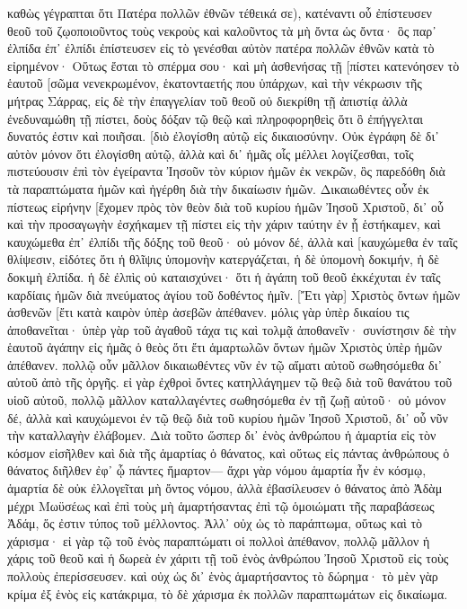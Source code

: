 καθὼς γέγραπται ὅτι Πατέρα πολλῶν ἐθνῶν τέθεικά σε), κατέναντι οὗ ἐπίστευσεν θεοῦ τοῦ ζῳοποιοῦντος τοὺς νεκροὺς καὶ καλοῦντος τὰ μὴ ὄντα ὡς ὄντα· 
ὃς παρ᾽ ἐλπίδα ἐπ᾽ ἐλπίδι ἐπίστευσεν εἰς τὸ γενέσθαι αὐτὸν πατέρα πολλῶν ἐθνῶν κατὰ τὸ εἰρημένον· Οὕτως ἔσται τὸ σπέρμα σου· 
καὶ μὴ ἀσθενήσας τῇ [πίστει κατενόησεν τὸ ἑαυτοῦ [σῶμα νενεκρωμένον, ἑκατονταετής που ὑπάρχων, καὶ τὴν νέκρωσιν τῆς μήτρας Σάρρας, 
εἰς δὲ τὴν ἐπαγγελίαν τοῦ θεοῦ οὐ διεκρίθη τῇ ἀπιστίᾳ ἀλλὰ ἐνεδυναμώθη τῇ πίστει, δοὺς δόξαν τῷ θεῷ 
καὶ πληροφορηθεὶς ὅτι ὃ ἐπήγγελται δυνατός ἐστιν καὶ ποιῆσαι. 
[διὸ ἐλογίσθη αὐτῷ εἰς δικαιοσύνην. 
Οὐκ ἐγράφη δὲ δι᾽ αὐτὸν μόνον ὅτι ἐλογίσθη αὐτῷ, 
ἀλλὰ καὶ δι᾽ ἡμᾶς οἷς μέλλει λογίζεσθαι, τοῖς πιστεύουσιν ἐπὶ τὸν ἐγείραντα Ἰησοῦν τὸν κύριον ἡμῶν ἐκ νεκρῶν, 
ὃς παρεδόθη διὰ τὰ παραπτώματα ἡμῶν καὶ ἠγέρθη διὰ τὴν δικαίωσιν ἡμῶν. 
Δικαιωθέντες οὖν ἐκ πίστεως εἰρήνην [ἔχομεν πρὸς τὸν θεὸν διὰ τοῦ κυρίου ἡμῶν Ἰησοῦ Χριστοῦ, 
δι᾽ οὗ καὶ τὴν προσαγωγὴν ἐσχήκαμεν τῇ πίστει εἰς τὴν χάριν ταύτην ἐν ᾗ ἑστήκαμεν, καὶ καυχώμεθα ἐπ᾽ ἐλπίδι τῆς δόξης τοῦ θεοῦ· 
οὐ μόνον δέ, ἀλλὰ καὶ [καυχώμεθα ἐν ταῖς θλίψεσιν, εἰδότες ὅτι ἡ θλῖψις ὑπομονὴν κατεργάζεται, 
ἡ δὲ ὑπομονὴ δοκιμήν, ἡ δὲ δοκιμὴ ἐλπίδα. 
ἡ δὲ ἐλπὶς οὐ καταισχύνει· ὅτι ἡ ἀγάπη τοῦ θεοῦ ἐκκέχυται ἐν ταῖς καρδίαις ἡμῶν διὰ πνεύματος ἁγίου τοῦ δοθέντος ἡμῖν. 
[Ἔτι γὰρ] Χριστὸς ὄντων ἡμῶν ἀσθενῶν [ἔτι κατὰ καιρὸν ὑπὲρ ἀσεβῶν ἀπέθανεν. 
μόλις γὰρ ὑπὲρ δικαίου τις ἀποθανεῖται· ὑπὲρ γὰρ τοῦ ἀγαθοῦ τάχα τις καὶ τολμᾷ ἀποθανεῖν· 
συνίστησιν δὲ τὴν ἑαυτοῦ ἀγάπην εἰς ἡμᾶς ὁ θεὸς ὅτι ἔτι ἁμαρτωλῶν ὄντων ἡμῶν Χριστὸς ὑπὲρ ἡμῶν ἀπέθανεν. 
πολλῷ οὖν μᾶλλον δικαιωθέντες νῦν ἐν τῷ αἵματι αὐτοῦ σωθησόμεθα δι᾽ αὐτοῦ ἀπὸ τῆς ὀργῆς. 
εἰ γὰρ ἐχθροὶ ὄντες κατηλλάγημεν τῷ θεῷ διὰ τοῦ θανάτου τοῦ υἱοῦ αὐτοῦ, πολλῷ μᾶλλον καταλλαγέντες σωθησόμεθα ἐν τῇ ζωῇ αὐτοῦ· 
οὐ μόνον δέ, ἀλλὰ καὶ καυχώμενοι ἐν τῷ θεῷ διὰ τοῦ κυρίου ἡμῶν Ἰησοῦ Χριστοῦ, δι᾽ οὗ νῦν τὴν καταλλαγὴν ἐλάβομεν. 
Διὰ τοῦτο ὥσπερ δι᾽ ἑνὸς ἀνθρώπου ἡ ἁμαρτία εἰς τὸν κόσμον εἰσῆλθεν καὶ διὰ τῆς ἁμαρτίας ὁ θάνατος, καὶ οὕτως εἰς πάντας ἀνθρώπους ὁ θάνατος διῆλθεν ἐφ᾽ ᾧ πάντες ἥμαρτον— 
ἄχρι γὰρ νόμου ἁμαρτία ἦν ἐν κόσμῳ, ἁμαρτία δὲ οὐκ ἐλλογεῖται μὴ ὄντος νόμου, 
ἀλλὰ ἐβασίλευσεν ὁ θάνατος ἀπὸ Ἀδὰμ μέχρι Μωϋσέως καὶ ἐπὶ τοὺς μὴ ἁμαρτήσαντας ἐπὶ τῷ ὁμοιώματι τῆς παραβάσεως Ἀδάμ, ὅς ἐστιν τύπος τοῦ μέλλοντος. 
Ἀλλ᾽ οὐχ ὡς τὸ παράπτωμα, οὕτως καὶ τὸ χάρισμα· εἰ γὰρ τῷ τοῦ ἑνὸς παραπτώματι οἱ πολλοὶ ἀπέθανον, πολλῷ μᾶλλον ἡ χάρις τοῦ θεοῦ καὶ ἡ δωρεὰ ἐν χάριτι τῇ τοῦ ἑνὸς ἀνθρώπου Ἰησοῦ Χριστοῦ εἰς τοὺς πολλοὺς ἐπερίσσευσεν. 
καὶ οὐχ ὡς δι᾽ ἑνὸς ἁμαρτήσαντος τὸ δώρημα· τὸ μὲν γὰρ κρίμα ἐξ ἑνὸς εἰς κατάκριμα, τὸ δὲ χάρισμα ἐκ πολλῶν παραπτωμάτων εἰς δικαίωμα. 
